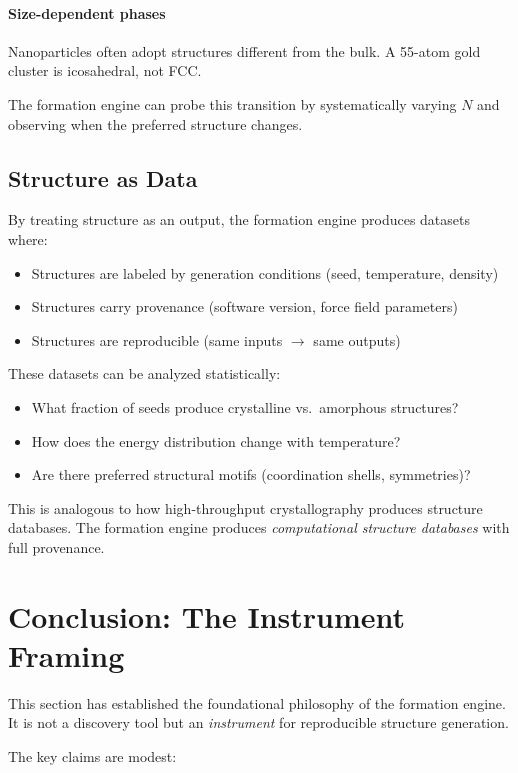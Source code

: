 \documentclass[11pt]{article}
\begin{document}
\paragraph{Size-dependent phases} Nanoparticles often adopt structures different from the bulk. A 55-atom gold cluster is icosahedral, not FCC.

The formation engine can probe this transition by systematically varying $N$ and observing when the preferred structure changes.

\subsection{Structure as Data}

By treating structure as an output, the formation engine produces datasets where:

\begin{itemize}
\item Structures are labeled by generation conditions (seed, temperature, density)
\item Structures carry provenance (software version, force field parameters)
\item Structures are reproducible (same inputs $\to$ same outputs)
\end{itemize}

These datasets can be analyzed statistically:
\begin{itemize}
\item What fraction of seeds produce crystalline vs.\ amorphous structures?
\item How does the energy distribution change with temperature?
\item Are there preferred structural motifs (coordination shells, symmetries)?
\end{itemize}

This is analogous to how high-throughput crystallography produces structure databases. The formation engine produces \textit{computational structure databases} with full provenance.

\section{Conclusion: The Instrument Framing}

This section has established the foundational philosophy of the formation engine. It is not a discovery tool but an \textit{instrument} for reproducible structure generation.

The key claims are modest:
\end{document}
